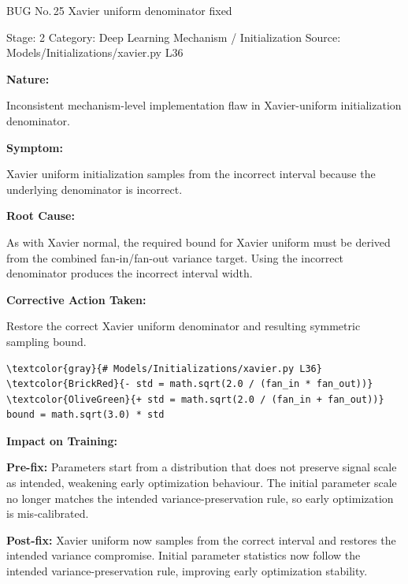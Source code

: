 \documentclass[10pt]{article}
\newcommand{\FieldLabel}[1]{%
 {\bfseries #1:}\par
}
\begin{document}
\begin{bugbox}{BUG No.\,25 \quad Xavier uniform denominator fixed}
{\color{MetaGray}\small Stage: 2 \;\textbar\; Category: Deep Learning Mechanism / Initialization \;\textbar\; Source: Models/Initializations/xavier.py L36\par}
\vspace{0.22em}
\FieldLabel{Nature}
Inconsistent mechanism-level implementation flaw in Xavier-uniform initialization denominator.
\par
\vspace{0.35em}
\FieldLabel{Symptom}
Xavier uniform initialization samples from the incorrect interval because the underlying denominator is incorrect.
\par
\vspace{0.35em}
\FieldLabel{Root Cause}
As with Xavier normal, the required bound for Xavier uniform must be derived from the combined fan-in/fan-out variance target. Using the incorrect denominator produces the incorrect interval width.
\par
\vspace{0.35em}
\FieldLabel{Corrective Action Taken}
Restore the correct Xavier uniform denominator and resulting symmetric sampling bound.
\par
\vspace{0.35em}
\begin{Verbatim}[commandchars=\\\{\},fontsize=\footnotesize,breaklines=true,breaksymbol={},frame=leftline,framerule=2pt,rulecolor=\color{gray!40},xleftmargin=6pt,formatcom=\singlespacing]
\textcolor{gray}{# Models/Initializations/xavier.py L36}
\textcolor{BrickRed}{- std = math.sqrt(2.0 / (fan_in * fan_out))}
\textcolor{OliveGreen}{+ std = math.sqrt(2.0 / (fan_in + fan_out))}
bound = math.sqrt(3.0) * std
\end{Verbatim}
\vspace{0.22em}
\FieldLabel{Impact on Training}
\textbf{Pre-fix:} Parameters start from a distribution that does not preserve signal scale as intended, weakening early optimization behaviour. The initial parameter scale no longer matches the intended variance-preservation rule, so early optimization is mis-calibrated. \par\smallskip
\textbf{Post-fix:} Xavier uniform now samples from the correct interval and restores the intended variance compromise. Initial parameter statistics now follow the intended variance-preservation rule, improving early optimization stability. 
\par
\vspace{0.35em}
\end{bugbox}
\end{document}
